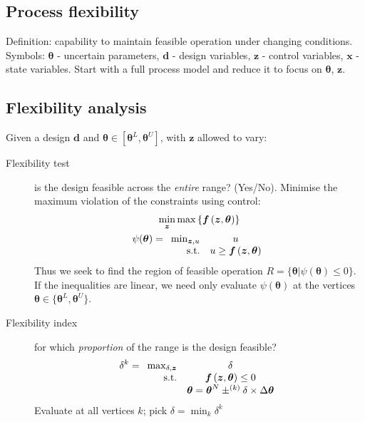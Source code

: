 \documentclass[a4paper,twocolumn,10pt]{article}
\begin{document}
\subsection{Process flexibility}
Definition: capability to maintain feasible operation under changing conditions.
Symbols: $\boldsymbol{\theta}$ - uncertain parameters, $\boldsymbol{d}$ - design variables, $\boldsymbol{z}$ - control variables, $\boldsymbol{x}$ - state variables.
Start with a full process model and reduce it to focus on $\boldsymbol{\theta}$, $\boldsymbol{z}$.
\subsection{Flexibility analysis}
Given a design $\boldsymbol{d}$ and $\boldsymbol{\theta} \in [\boldsymbol{\theta}^L,\boldsymbol{\theta}^U]$, with $\boldsymbol{z}$ allowed to vary:
\begin{description}
    \item[Flexibility test] is the design feasible across the \textit{entire} range? (Yes/No).
        Minimise the maximum violation of the constraints using control:
        \begin{gather*}
            \min_{\boldsymbol{z}} \max\left\{\boldsymbol{f}\left(\boldsymbol{z}, \boldsymbol{\theta}\right)\right\} \\
            \psi(\boldsymbol{\theta}) = \begin{array}[t]{rc} \min _{\boldsymbol{z},u} & u \\
                \text {s.t.} & u \geq \boldsymbol{f}\left(\boldsymbol{z},\boldsymbol{\theta}\right)
            \end{array}
        \end{gather*}
        Thus we seek to find the region of feasible operation $R = \{\boldsymbol{\theta} | \psi(\boldsymbol{\theta}) \leq 0\}$.
        If the inequalities are linear, we need only evaluate $\psi(\boldsymbol{\theta})$ at the vertices $\boldsymbol{\theta} \in \{\boldsymbol{\theta}^L,\boldsymbol{\theta}^U\}$.
    \item[Flexibility index] for which \textit{proportion} of the range is the design feasible?
        \begin{equation*}
            \delta^k =\begin{array}[t]{rc} \max_{\delta,\boldsymbol{z}} & \delta \\
            \text {s.t.} & \boldsymbol{f}\left(\boldsymbol{z},\boldsymbol{\theta}\right) \leq 0 \\
            & \boldsymbol{\theta} = \boldsymbol{\theta}^N \pm^{(k)} \delta\times\Delta\boldsymbol{\theta}
            \end{array}
        \end{equation*}
        Evaluate at all vertices $k$; pick $\delta = \min_{k} \delta^k$
\end{description}
\end{document}
